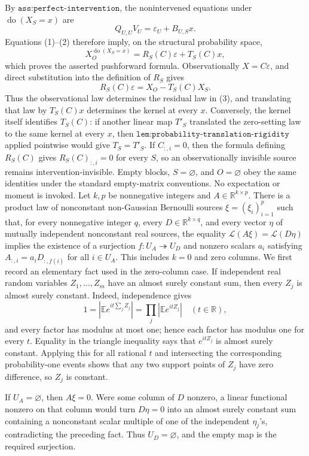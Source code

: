 By \(\texttt{ass:perfect-intervention}\), the nonintervened equations under \(\operatorname{do}(X_S=x)\) are
\[
Q_{U,U}V_U=\varepsilon_U+B_{U,S}x.
\]
Equations (1)--(2) therefore imply, on the structural probability space,
\[
X_O^{\operatorname{do}(X_S=x)}=R_S(C)\varepsilon+T_S(C)x,
\]
which proves the asserted pushforward formula. Observationally \(X=C\varepsilon\), and direct substitution into the definition of \(R_S\) gives
\[
R_S(C)\varepsilon=X_O-T_S(C)X_S. \tag{3}
\]
Thus the observational law determines the residual law in (3), and translating that law by \(T_S(C)x\) determines the kernel at every \(x\). Conversely, the kernel itself identifies \(T_S(C)\): if another linear map \(T'_S\) translated the zero-setting law to the same kernel at every \(x\), then \(\texttt{lem:probability-translation-rigidity}\) applied pointwise would give \(T_S=T'_S\). If \(C_{:,i}=0\), then the formula defining \(R_S(C)\) gives \(R_S(C)_{:,i}=0\) for every \(S\), so an observationally invisible source remains intervention-invisible. Empty blocks, \(S=\varnothing\), and \(O=\varnothing\) obey the same identities under the standard empty-matrix conventions. No expectation or moment is invoked.
Let \(k,p\) be nonnegative integers and \(A\in\mathbb R^{k\times p}\). There is a product law of nonconstant non-Gaussian Bernoulli sources \(\xi=(\xi_i)_{i=1}^p\) such that, for every nonnegative integer \(q\), every \(D\in\mathbb R^{k\times q}\), and every vector \(\eta\) of mutually independent nonconstant real sources, the equality \(\mathcal L(A\xi)=\mathcal L(D\eta)\) implies the existence of a surjection \(f:U_A\twoheadrightarrow U_D\) and nonzero scalars \(a_i\) satisfying \(A_{:,i}=a_iD_{:,f(i)}\) for all \(i\in U_A\). This includes \(k=0\) and zero columns.
We first record an elementary fact used in the zero-column case. If independent real random variables \(Z_1,\ldots,Z_m\) have an almost surely constant sum, then every \(Z_j\) is almost surely constant. Indeed, independence gives
\[
1=\left|\mathbb E e^{it\sum_jZ_j}\right|=\prod_j\left|\mathbb E e^{itZ_j}\right|\quad(t\in\mathbb R),
\]
and every factor has modulus at most one; hence each factor has modulus one for every \(t\). Equality in the triangle inequality says that \(e^{itZ_j}\) is almost surely constant. Applying this for all rational \(t\) and intersecting the corresponding probability-one events shows that any two support points of \(Z_j\) have zero difference, so \(Z_j\) is constant.

If \(U_A=\varnothing\), then \(A\xi=0\). Were some column of \(D\) nonzero, a linear functional nonzero on that column would turn \(D\eta=0\) into an almost surely constant sum containing a nonconstant scalar multiple of one of the independent \(\eta_j\)'s, contradicting the preceding fact. Thus \(U_D=\varnothing\), and the empty map is the required surjection.

